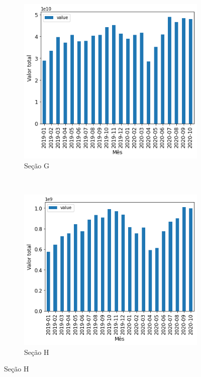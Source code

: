 \begin{figure}[htb] 
    \centering 
    \caption{Valor mensal transacionado por seção no período analisado (Parte 2)}
    \label{fig:pandemia:descritiva-16.2-valor-mensal-por-secao} 
    \begin{subfigure}[b]{0.45\textwidth}
        \includegraphics[scale=0.45]{images/base-de-dados-16.G-valor-mensal-por-secao.png}
        \caption{Seção G}
        \label{fig:pandemia:descritiva-16.G-valor-mensal-por-secao}
    \end{subfigure} ~ \quad
    \begin{subfigure}[b]{0.45\textwidth}
        \includegraphics[scale=0.45]{images/base-de-dados-16.H-valor-mensal-por-secao.png}
        \caption{Seção H}
        \label{fig:pandemia:descritiva-16.H-valor-mensal-por-secao}

\end{subfigure}
\end{figure}
